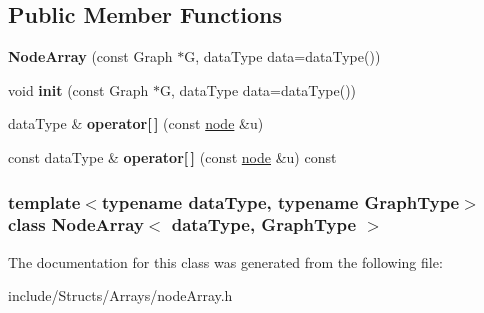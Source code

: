 \subsection*{Public Member Functions}
\begin{DoxyCompactItemize}
\item 
\hypertarget{class_node_array_a4cf0a20ddd12af2ad251014adf7b7dce}{
{\bfseries NodeArray} (const Graph $\ast$G, dataType data=dataType())}
\label{class_node_array_a4cf0a20ddd12af2ad251014adf7b7dce}

\item 
\hypertarget{class_node_array_a0227ef8360cbb9bbdcce6ef06c302c85}{
void {\bfseries init} (const Graph $\ast$G, dataType data=dataType())}
\label{class_node_array_a0227ef8360cbb9bbdcce6ef06c302c85}

\item 
\hypertarget{class_node_array_a85f7d7473615443b1a5637324e229e8c}{
dataType \& {\bfseries operator\mbox{[}$\,$\mbox{]}} (const \hyperlink{classnode}{node} \&u)}
\label{class_node_array_a85f7d7473615443b1a5637324e229e8c}

\item 
\hypertarget{class_node_array_ab3dc6902ab3700e53bb4d7ed373ad9f7}{
const dataType \& {\bfseries operator\mbox{[}$\,$\mbox{]}} (const \hyperlink{classnode}{node} \&u) const }
\label{class_node_array_ab3dc6902ab3700e53bb4d7ed373ad9f7}

\end{DoxyCompactItemize}
\subsubsection*{template$<$typename dataType, typename GraphType$>$ class NodeArray$<$ dataType, GraphType $>$}



The documentation for this class was generated from the following file:\begin{DoxyCompactItemize}
\item 
include/Structs/Arrays/nodeArray.h\end{DoxyCompactItemize}
